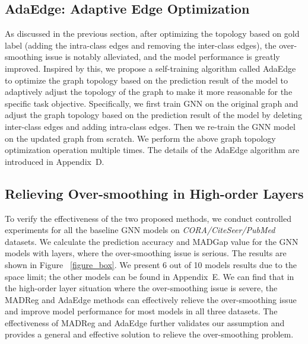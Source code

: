 \documentclass[letterpaper]{article} \usepackage{aaai20}  \usepackage{times}  \usepackage{helvet} \usepackage{courier}  \usepackage[hyphens]{url}  \usepackage{graphicx} \urlstyle{rm} \def\UrlFont{\rm}  \frenchspacing  \setlength{\pdfpagewidth}{8.5in}  \setlength{\pdfpageheight}{11in}  \setcounter{secnumdepth}{0}
\begin{document}
\subsection{AdaEdge: Adaptive Edge Optimization}
As discussed in the previous section, after optimizing the topology based on gold label (adding the intra-class edges and removing the inter-class edges), the over-smoothing issue is notably alleviated, and the model performance is greatly improved. Inspired by this, we propose a self-training algorithm called AdaEdge to optimize the graph topology based on the prediction result of the model to adaptively adjust the topology of the graph to make it more reasonable for the specific task objective. Specifically, we first train GNN on the original graph and adjust the graph topology based on the prediction result of the model by deleting inter-class edges and adding intra-class edges. Then we re-train the GNN model on the updated graph from scratch. We perform the above graph topology optimization operation multiple times. 
The details of the AdaEdge algorithm are introduced in Appendix~D. 

\subsection{Relieving Over-smoothing in High-order Layers}

To verify the effectiveness of the two proposed methods, we conduct controlled experiments for all the  baseline GNN models on \textit{CORA/CiteSeer/PubMed} datasets. We calculate the prediction accuracy and MADGap value for the GNN models with  layers, where the over-smoothing issue is serious. The results are shown in Figure~ \ref{figure_box}. We present 6 out of 10 models results due to the space limit; the other models can be found in Appendix~E.
We can find that in the high-order layer situation where the over-smoothing issue is severe, the MADReg and AdaEdge methods can effectively relieve the over-smoothing issue and improve model performance for most models in all three datasets.
The effectiveness of MADReg and AdaEdge further validates our assumption and provides a general and effective solution to relieve the over-smoothing problem.
\end{document}
